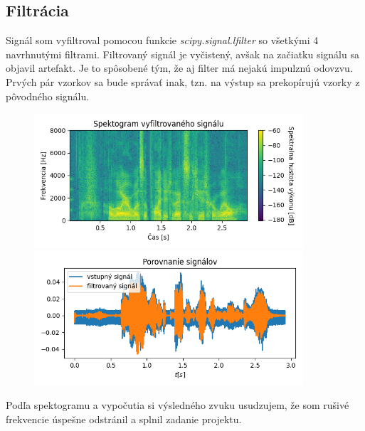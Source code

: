 \documentclass[a4paper,oneside]{article}
\begin{document}
	\newpage
	\subsection{Filtrácia}
	
	Signál som vyfiltroval pomocou funkcie \textit{scipy.signal.lfilter} so všetkými 4 navrhnutými filtrami. Filtrovaný signál je vyčistený, avšak na začiatku signálu sa objavil artefakt. Je to spôsobené tým, že aj filter má nejakú impulznú odovzvu. Prvých pár vzorkov sa bude správať inak, tzn. na výstup sa prekopírujú vzorky z pôvodného signálu.
	
	\begin{figure}[h]
	    \begin{center}
		    \includegraphics[width=10cm,keepaspectratio]{uloha4-10-1.png}
		    \includegraphics[width=10cm,keepaspectratio]{uloha4-10-2.png}
		\end{center}
	\end{figure}
    
    Podľa spektogramu a vypočutia si výsledného zvuku usudzujem, že som rušivé frekvencie úspešne odstránil a splnil zadanie projektu.
\end{document}
